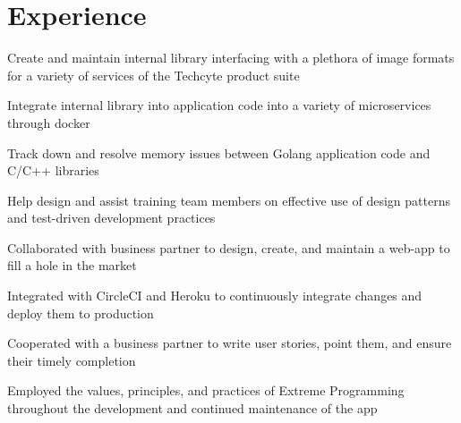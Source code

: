 \documentclass[]{resume-openfont}
\begin{document}
\hfill
\begin{minipage}[t]{0.66\textwidth} 


\section{Experience}

\vspace{\topsep}
\begin{tightemize}
    \item Create and maintain internal library interfacing with a plethora of image formats for a variety of services of the Techcyte product suite
    \item Integrate internal library into application code into a variety of microservices through docker
    \item Track down and resolve memory issues between Golang application code and C/C++ libraries
    \item Help design and assist training team members on effective use of design patterns and test-driven development practices
\end{tightemize}
\sectionsep

\vspace{\topsep} %
\begin{tightemize}
	\item Collaborated with business partner to design, create, and maintain a web-app to fill a hole in the market
    \item Integrated with CircleCI and Heroku to continuously integrate changes and deploy them to production
    \item Cooperated with a business partner to write user stories, point them, and ensure their timely completion
    \item Employed the values, principles, and practices of Extreme Programming throughout the development and continued maintenance of the app
\end{tightemize}
\sectionsep


\end{minipage}
\end{document}
